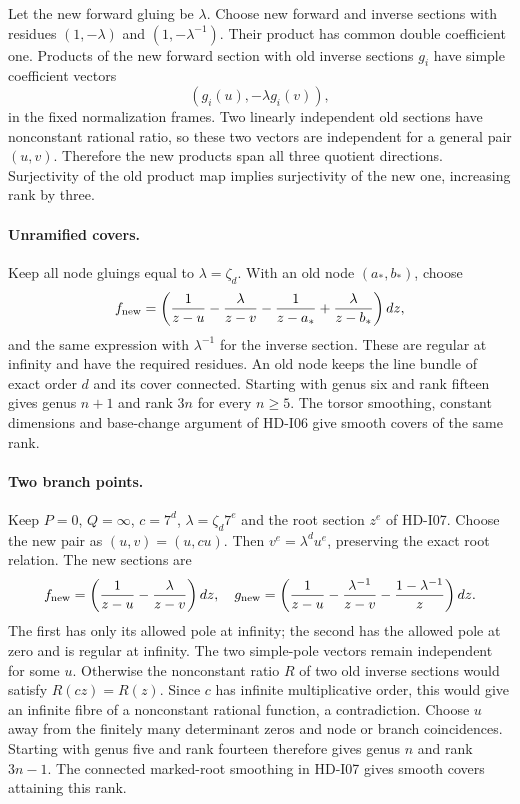 Let the new forward gluing be $\lambda$. Choose new forward and inverse
sections with residues $(1,-\lambda)$ and $(1,-\lambda^{-1})$.
Their product has common double coefficient one. Products of the new
forward section with old inverse sections $g_i$ have simple
coefficient vectors
\[
 (g_i(u),-\lambda g_i(v)),
\]
in the fixed normalization frames. Two linearly independent old
sections have nonconstant rational ratio, so these two vectors are
independent for a general pair $(u,v)$. Therefore the new products
span all three quotient directions. Surjectivity of the old product
map implies surjectivity of the new one, increasing rank by three.

\paragraph{Unramified covers.}
Keep all node gluings equal to $\lambda=\zeta_d$. With an old node
$(a_*,b_*)$, choose
\[
 f_{\rm new}=
 \left(\frac1{z-u}-\frac\lambda{z-v}
       -\frac1{z-a_*}+\frac\lambda{z-b_*}\right)dz,
\]
and the same expression with $\lambda^{-1}$ for the inverse section.
These are regular at infinity and have the required residues. An old
node keeps the line bundle of exact order $d$ and its cover connected.
Starting with genus six and rank fifteen gives genus $n+1$ and rank
$3n$ for every $n\ge5$. The torsor smoothing, constant dimensions and
base-change argument of HD-I06 give smooth covers of the same rank.

\paragraph{Two branch points.}
Keep $P=0$, $Q=\infty$, $c=7^d$, $\lambda=\zeta_d7^e$ and the root
section $z^e$ of HD-I07. Choose the new pair as $(u,v)=(u,cu)$.
Then $v^e=\lambda^du^e$, preserving the exact root relation.
The new sections are
\[
 f_{\rm new}=\left(\frac1{z-u}-\frac\lambda{z-v}\right)dz,
 \quad
 g_{\rm new}=\left(\frac1{z-u}-\frac{\lambda^{-1}}{z-v}
                     -\frac{1-\lambda^{-1}}z\right)dz.
\]
The first has only its allowed pole at infinity; the second has the
allowed pole at zero and is regular at infinity. The two simple-pole
vectors remain independent for some $u$. Otherwise the nonconstant
ratio $R$ of two old inverse sections would satisfy $R(cz)=R(z)$.
Since $c$ has infinite multiplicative order, this would give an
infinite fibre of a nonconstant rational function, a contradiction.
Choose $u$ away from the finitely many determinant zeros and node or
branch coincidences. Starting with genus five and rank fourteen
therefore gives genus $n$ and rank $3n-1$. The connected marked-root
smoothing in HD-I07 gives smooth covers attaining this rank.

